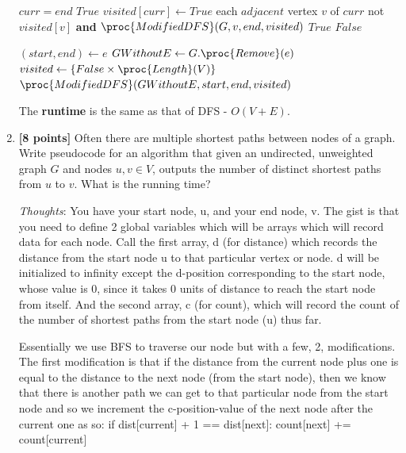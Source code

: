 \documentclass[11pt]{article}
\begin{document}
\begin{enumerate}
\begin{codebox}
    \li \If $curr = end$
    \li     \Return $True$
        \End
    \li $visited[curr] \gets True$
    \li \For each $adjacent$ vertex $v$ of $curr$
    \li   \hspace{4 pt}  \If not $visited[v]$ \textbf{and} $\proc{ModifiedDFS}(G, v, end, visited)$ 
    \li         \hspace{12 pt} \Return $True$
            \End
        \End
    \li \Return $False$
\end{codebox}

\begin{codebox}
\li $(start, end) \gets e$
\li $GWithoutE \gets G.\proc{Remove}(e)$
\li $visited \gets \{False \times \proc{Length}(V)\}$
\li \Return $\proc{ModifiedDFS}(GWithoutE, start, end, visited)$
\end{codebox}
The \textbf{runtime} is the same as that of DFS - $O(V+E)$.

\item \textbf{[8 points]} Often there are multiple shortest paths between nodes of a graph.  Write pseudocode for an algorithm that given an undirected, unweighted graph $G$ and nodes $u,v \in V$, outputs the number of distinct shortest paths from $u$ to $v$.  What is the running time?

\emph{Thoughts}: You have your start node, u, and your end node, v. The gist is that you need to define 2 global variables which will be arrays which will record data for each node. Call the first array, d (for distance) which records the distance from the start node u to that particular vertex or node. d will be initialized to infinity except the d-position corresponding to the start node, whose value is 0, since it takes 0 units of distance to reach the start node from itself. And the second array, c (for count), which will record the count of the number of shortest paths from the start node (u) thus far. 

Essentially we use BFS to traverse our node but with a few, 2, modifications.
The first modification is that if the distance from the current node plus one is equal to the distance to the next node (from the start node), then we know that there is another path we can get to that particular node from the start node and so we increment the c-position-value of the next node after the current one as so:
if dist[current] + 1 == dist[next]:
	count[next] += count[current]


\end{enumerate}
\end{document}
